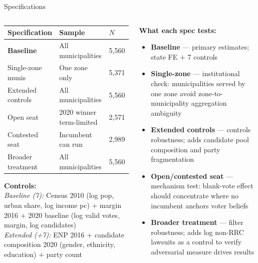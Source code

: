\documentclass[aspectratio=169,10pt]{beamer}
\begin{document}
\begin{frame}{Specifications}
\begin{columns}[T]
\begin{column}{0.56\textwidth}
\footnotesize
\renewcommand{\arraystretch}{1.15}
\begin{tabular}{L{2.6cm}L{2.0cm}R{1.6cm}}
  \toprule
  Specification & Sample & $N$ \\
  \midrule
  \textbf{Baseline} & All municipalities & 5,560 \\
  Single-zone munis & One zone only & 5,371 \\
  Extended controls & All municipalities & 5,560 \\[3pt]
  Open seat & 2020 winner term-limited & 2,571 \\
  Contested seat & Incumbent can run & 2,989 \\[3pt]
  Broader treatment & All municipalities & 5,560 \\
  \bottomrule
\end{tabular}
\normalsize

\vspace{6pt}
\footnotesize
\textbf{Controls:}\\
\textit{Baseline (7):} Census 2010 (log pop, urban share, log income pc) $+$ margin 2016 $+$ 2020 baseline (log valid votes, margin, log candidates)\\[4pt]
\textit{Extended (+7):} ENP 2016 $+$ candidate composition 2020 (gender, ethnicity, education) $+$ party count
\end{column}

\begin{column}{0.42\textwidth}
\textbf{What each spec tests:}
\smallskip

\footnotesize
\begin{itemize}\itemsep4pt
  \item \textbf{Baseline} --- primary estimates; state FE $+$ 7 controls
  \item \textbf{Single-zone} --- institutional check: municipalities served by one zone avoid zone-to-municipality aggregation ambiguity
  \item \textbf{Extended controls} --- controls robustness; adds candidate pool composition and party fragmentation
  \item \textbf{Open/contested seat} --- mechanism test: blank-vote effect should concentrate where no incumbent anchors voter beliefs
  \item \textbf{Broader treatment} --- filter robustness; adds log non-RRC lawsuits as a control to verify adversarial measure drives results
\end{itemize}
\end{column}
\end{columns}
\end{frame}
\end{document}
